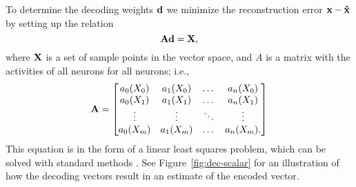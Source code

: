 {To determine the decoding weights $\mathbf{d}$
we minimize the reconstruction error
$\mathbf{x} - \mathbf{\hat{x}}$
by setting up the relation
\begin{equation*}
  \mathbf{Ad} = \mathbf{X},
\end{equation*}
where $\mathbf{X}$ is a set of sample points
in the vector space,
and $A$ is a matrix with the activities
of all neurons for all neurons;
i.e.,
\begin{equation*} \label{eq:decoding}
  \label{A}
  \mathbf{A} =
  \begin{bmatrix}
    a_0(X_0) & a_1(X_0) & \dots  & a_n(X_0) \\
    a_0(X_1) & a_1(X_1) & \dots  & a_n(X_1) \\
    \vdots & \vdots & \ddots & \vdots \\
    a_0(X_m) & a_1(X_m) & \dots  & a_n(X_m).
  \end{bmatrix}
\end{equation*}
This equation is in the form
of a linear least squares problem,
which can be solved with standard methods
\cite{lawson1974}.
See Figure~\ref{fig:dec-scalar} for an illustration
of how the decoding vectors
result in an estimate of the encoded vector.


}
